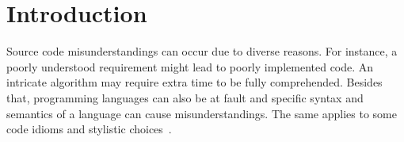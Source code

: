 \section{Introduction}
\label{intro}




Source code misunderstandings can occur due to diverse reasons.
For instance, a poorly understood requirement might lead to poorly implemented code.
An intricate algorithm may require extra time to be fully comprehended.
Besides that, programming languages can also be at fault
and specific syntax and semantics of a language can cause misunderstandings. The same applies to some code
idioms and stylistic choices~\cite{DBLP:conf/msr/GopsteinZFC18}.


